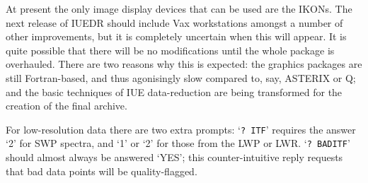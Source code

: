 At present the only image display devices that can be used are the IKONs. 
The next release of IUEDR should include Vax workstations amongst a number
of other improvements, but it is completely uncertain when this will appear. 
It is quite possible that there will be no modifications until the whole
package is overhauled. There are two reasons why this is expected: the 
graphics packages are still Fortran-based, and thus agonisingly slow compared
to, say, ASTERIX or Q; and the basic techniques of IUE data-reduction are 
being transformed for the creation of the final archive. 

For low-resolution data there are two extra prompts: `{\tt ? ITF}' requires
the answer `2' for SWP spectra, and `1' or `2' for those from the LWP or LWR.
`{\tt ? BADITF}' should almost always be answered `YES'; this 
counter-intuitive reply requests that bad data points will be quality-flagged.

